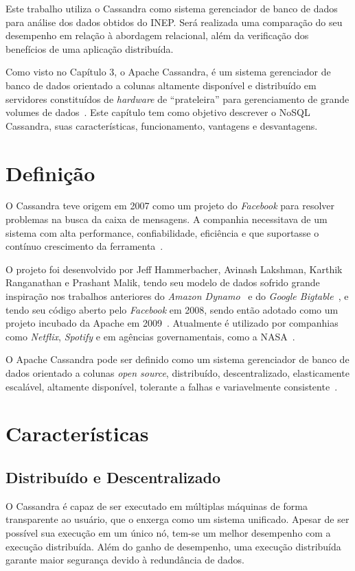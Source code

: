 Este trabalho utiliza o Cassandra como sistema gerenciador de banco de dados para análise dos dados obtidos do INEP. Será realizada uma comparação do seu desempenho em relação à abordagem relacional, além da verificação dos benefícios de uma aplicação distribuída.

Como visto no Capítulo 3, o Apache Cassandra, é um sistema gerenciador de banco de dados orientado a colunas altamente disponível e distribuído em servidores constituídos de \emph{hardware} de \enquote{prateleira} para gerenciamento de grande volumes de dados~\cite{lakshmancassandra}. Este capítulo tem como objetivo descrever o NoSQL Cassandra, suas características, funcionamento, vantagens e desvantagens.

\section{Definição}
O Cassandra teve origem em 2007 como um projeto do \emph{Facebook} para resolver problemas na busca da caixa de mensagens. A companhia necessitava de um sistema com alta performance, confiabilidade, eficiência e que suportasse o contínuo crescimento da ferramenta~\cite{lakshmancassandra}. 

O projeto foi desenvolvido por Jeff Hammerbacher, Avinash Lakshman, Karthik Ranganathan e Prashant Malik, tendo seu modelo de dados sofrido grande inspiração nos trabalhos anteriores do \emph{Amazon Dynamo}~\cite{dynamo} e do \emph{Google Bigtable}~\cite{bigtable}, e tendo seu código aberto pelo \emph{Facebook} em 2008, sendo então adotado como um projeto incubado da Apache em 2009~\cite{cassandraguide}. Atualmente é utilizado por companhias como \emph{Netflix}, \emph{Spotify} e em agências governamentais, como a NASA~\cite{cassandracompanies}. 

O Apache Cassandra pode ser definido como um sistema gerenciador de banco de dados orientado a colunas \emph{open source}, distribuído, descentralizado, elasticamente escalável, altamente disponível, tolerante a falhas e variavelmente consistente~\cite{cassandraguide}.


\section{Características}

\subsection*{Distribuído e Descentralizado}
O Cassandra é capaz de ser executado em múltiplas máquinas de forma transparente ao usuário, que o enxerga como um sistema unificado. Apesar de ser possível sua execução em um único nó, tem-se um melhor desempenho com a execução distribuída. Além do ganho de desempenho, uma execução distribuída garante maior segurança devido à redundância de dados.

